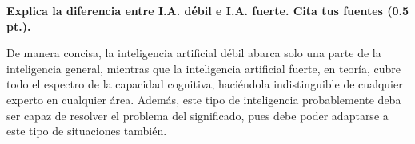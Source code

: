 \textbf{Explica la diferencia entre I.A. débil e I.A. fuerte. Cita tus fuentes (0.5 pt.).}

De manera concisa, la inteligencia artificial débil abarca solo una parte de la inteligencia general, mientras que la inteligencia artificial fuerte, en teoría, cubre todo el espectro de la capacidad cognitiva, haciéndola indistinguible de cualquier experto en cualquier área. Además, este tipo de inteligencia probablemente deba ser capaz de resolver el problema del significado, pues debe poder adaptarse a este tipo de situaciones también.

\cite{searle1980minds} 
\cite{russell2020artificial}
